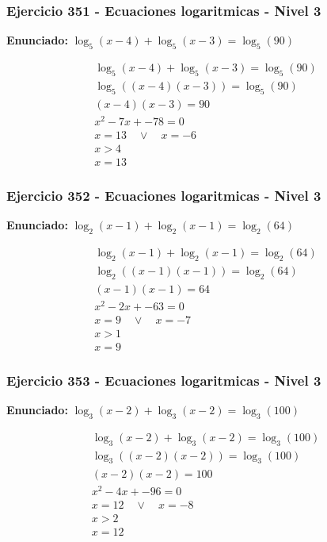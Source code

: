 \documentclass[12pt,a4paper]{article}
\begin{document}
\subsubsection*{Ejercicio 351 - Ecuaciones logaritmicas - Nivel 3}
\textbf{Enunciado:} \(\log_{5}\left(x-4\right)+\log_{5}\left(x-3\right)=\log_{5}\left(90\right)\)

\[
\begin{aligned}
\log_{5}\left(x-4\right)+\log_{5}\left(x-3\right)=\log_{5}\left(90\right)\\
\log_{5}\left((x-4)(x-3)\right)=\log_{5}\left(90\right)\\
(x-4)(x-3)=90\\
x^2-7x+-78=0\\
x=13\quad \vee\quad x=-6\\
x>4\\
\boxed{x=13}
\end{aligned}
\]


\subsubsection*{Ejercicio 352 - Ecuaciones logaritmicas - Nivel 3}
\textbf{Enunciado:} \(\log_{2}\left(x-1\right)+\log_{2}\left(x-1\right)=\log_{2}\left(64\right)\)

\[
\begin{aligned}
\log_{2}\left(x-1\right)+\log_{2}\left(x-1\right)=\log_{2}\left(64\right)\\
\log_{2}\left((x-1)(x-1)\right)=\log_{2}\left(64\right)\\
(x-1)(x-1)=64\\
x^2-2x+-63=0\\
x=9\quad \vee\quad x=-7\\
x>1\\
\boxed{x=9}
\end{aligned}
\]


\subsubsection*{Ejercicio 353 - Ecuaciones logaritmicas - Nivel 3}
\textbf{Enunciado:} \(\log_{3}\left(x-2\right)+\log_{3}\left(x-2\right)=\log_{3}\left(100\right)\)

\[
\begin{aligned}
\log_{3}\left(x-2\right)+\log_{3}\left(x-2\right)=\log_{3}\left(100\right)\\
\log_{3}\left((x-2)(x-2)\right)=\log_{3}\left(100\right)\\
(x-2)(x-2)=100\\
x^2-4x+-96=0\\
x=12\quad \vee\quad x=-8\\
x>2\\
\boxed{x=12}
\end{aligned}
\]
\end{document}
